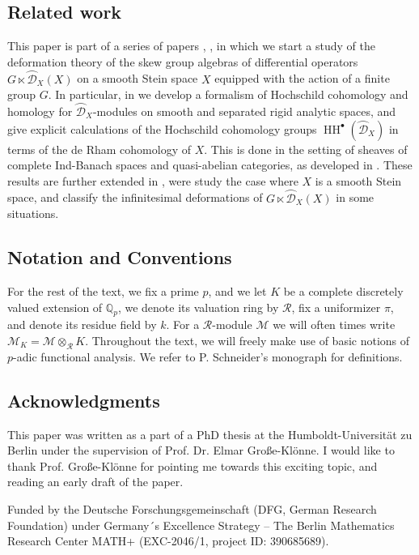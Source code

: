 \documentclass{amsart}
\newcommand{\D}{\mathcal{D}}
\begin{document}
\subsection*{Related work}
This paper is part of a series of papers \cite{p-adicCheralg}, \cite{HochschildDmodules}, \cite{HochschildDmodules2} in which we start a study of the deformation theory of the skew group algebras of differential operators $G\ltimes \wideparen{\D}_X(X)$ on a smooth Stein space $X$ equipped with the action of a finite group $G$. In particular, in \cite{HochschildDmodules} we develop a formalism of Hochschild cohomology and homology for $\wideparen{\D}_X$-modules on smooth and separated rigid analytic spaces, and give explicit calculations of the Hochschild cohomology groups $\operatorname{HH}^{\bullet}(\wideparen{\D}_X)$ in terms of the de Rham cohomology of $X$. This is done in the setting of sheaves of complete Ind-Banach spaces and quasi-abelian categories, as developed in \cite{bode2021operations}. These results are further extended in \cite{HochschildDmodules2}, were study the case where $X$ is a smooth Stein space, and  classify the infinitesimal deformations of $G\ltimes\wideparen{\D}_X(X)$ in some situations.
\subsection*{Notation and Conventions}
 For the rest of the text, we fix a prime $p$, and we let $K$ be a complete discretely valued extension of $\mathbb{Q}_p$, we denote its valuation ring by $\mathcal{R}$, fix a uniformizer $\pi$, and denote its residue field by $k$. For a $\mathcal{R}$-module $\mathcal{M}$ we will often times
 write $\mathcal{M}_K=\mathcal{M}\otimes_{\mathcal{R}}K$. Throughout the text, we will freely make use of basic notions of $p$-adic functional analysis. We refer to P. Schneider's monograph \cite{schneider2013nonarchimedean} for definitions. 
\subsection*{Acknowledgments}
This paper was written as a part of a PhD thesis at the Humboldt-Universität zu Berlin under the supervision of Prof. Dr. Elmar Große-Klönne. I would like to thank Prof. Große-Klönne
for pointing me towards this exciting topic, and reading an early draft of the paper.

\bigskip
Funded by the Deutsche Forschungsgemeinschaft (DFG, German Research
Foundation) under Germany´s Excellence Strategy – The Berlin Mathematics
Research Center MATH+ (EXC-2046/1, project ID: 390685689).
\end{document}
